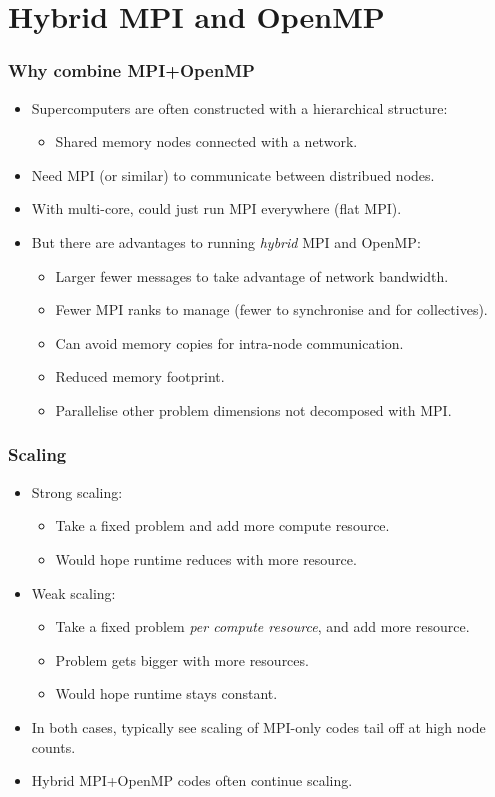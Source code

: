 \documentclass{beamer}
\begin{document}
\section{Hybrid MPI and OpenMP}
\begin{frame}
\frametitle{Why combine MPI+OpenMP}
\begin{itemize}
  \item Supercomputers are often constructed with a hierarchical structure:
    \begin{itemize}
      \item Shared memory nodes connected with a network.
    \end{itemize}
  \item Need MPI (or similar) to communicate between distribued nodes.
  \item With multi-core, could just run MPI everywhere (flat MPI).
  \item But there are advantages to running \emph{hybrid} MPI and OpenMP:
    \begin{itemize}
      \item Larger fewer messages to take advantage of network bandwidth.
      \item Fewer MPI ranks to manage (fewer to synchronise and for collectives).
      \item Can avoid memory copies for intra-node communication.
      \item Reduced memory footprint.
      \item Parallelise other problem dimensions not decomposed with MPI.
    \end{itemize}
\end{itemize}
\end{frame}

\begin{frame}
\frametitle{Scaling}
\begin{itemize}
  \item Strong scaling:
    \begin{itemize}
      \item Take a fixed problem and add more compute resource.
      \item Would hope runtime reduces with more resource.
    \end{itemize}
  \item Weak scaling:
    \begin{itemize}
      \item Take a fixed problem \emph{per compute resource}, and add more resource.
      \item Problem gets bigger with more resources.
      \item Would hope runtime stays constant.
    \end{itemize}
  \item In both cases, typically see scaling of MPI-only codes tail off at high node counts.
  \item Hybrid MPI+OpenMP codes often continue scaling.
\end{itemize}
\end{frame}
\end{document}
